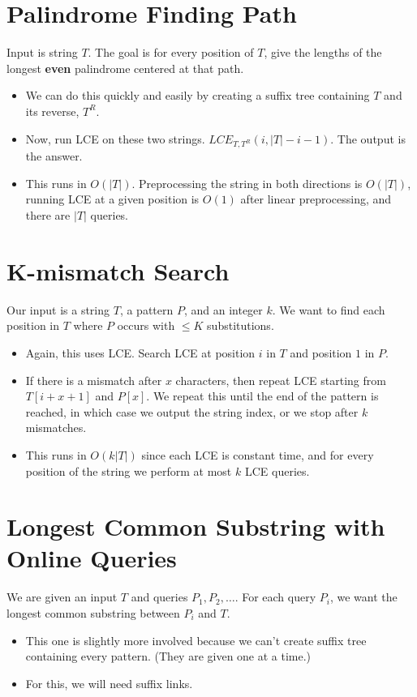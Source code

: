 \documentclass[10pt]{article}
\begin{document}
\section*{Palindrome Finding Path}
Input is string $T$.  The goal is for every position of $T$, give the lengths of the longest \textbf{even} palindrome centered at that path.
\begin{itemize}
	\item We can do this quickly and easily by creating a suffix tree containing $T$ and its reverse, $T^R$.
	\item Now, run LCE on these two strings.  $LCE_{T, T^R}(i, |T| - i - 1)$.  The output is the answer.
	\item This runs in $O(|T|)$.  Preprocessing the string in both directions is $O(|T|)$, running LCE at a given position is $O(1)$ after linear preprocessing, and there are $|T|$ queries.
\end{itemize}

\section*{K-mismatch Search}
Our input is a string $T$, a pattern $P$, and an integer $k$.  We want to find each position in $T$ where $P$ occurs with $\leq K$ substitutions.
\begin{itemize}
	\item Again, this uses LCE.  Search LCE at position $i$ in $T$ and position $1$ in $P$.  
    \item If there is a mismatch after $x$ characters, then repeat LCE starting from $T[i + x + 1]$ and $P[x]$.  We repeat this until the end of the pattern is reached, in which case we output the string index, or we stop after $k$ mismatches.
    \item This runs in $O(k|T|)$ since each LCE is constant time, and for every position of the string we perform at most $k$ LCE queries.
\end{itemize}

\section*{Longest Common Substring with Online Queries}
We are given an input $T$ and queries $P_1, P_2, \dots$.  For each query $P_i$, we want the longest common substring between $P_i$ and $T$.
\begin{itemize}
	\item This one is slightly more involved because we can't create suffix tree containing every pattern.  (They are given one at a time.)
	\item For this, we will need suffix links.
\end{itemize}
\end{document}
